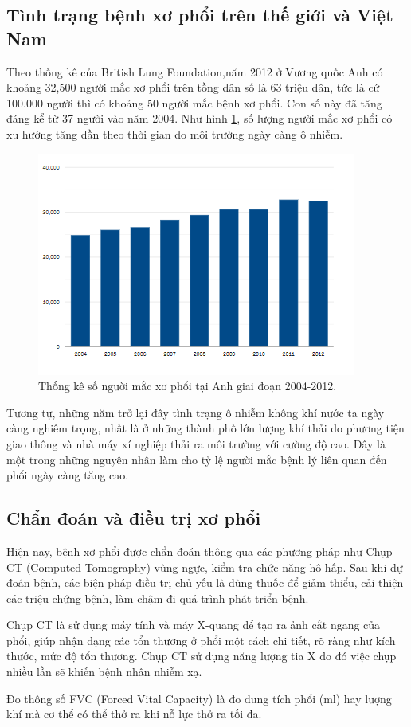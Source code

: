 \subsection{Tình trạng bệnh xơ phổi trên thế giới và Việt Nam}
Theo thống kê của British Lung Foundation,năm 2012 ở Vương quốc Anh có khoảng 32,500 người mắc xơ phổi trên tồng dân số là 63 triệu dân, tức là cứ 100.000 người thì có khoảng 50 người mắc bệnh xơ phổi. Con số này đã tăng đáng kể từ 37 người vào năm 2004. Như hình \ref{fig:pf2}, số lượng người mắc xơ phổi có xu hướng tăng dần theo thời gian do môi trường ngày càng ô nhiễm.\par
\begin{figure}[ht!]
\centerline{\includegraphics[scale=0.7]{images/pf2.png}}
\caption{Thống kê số người mắc xơ phổi tại Anh giai đoạn 2004-2012\cite{PF2:web}.}
\label{fig:pf2}
\end{figure}
Tương tự, những năm trở lại đây tình trạng ô nhiễm không khí nước ta ngày càng nghiêm trọng, nhất là ở những thành phố lớn lượng khí thải do phương tiện giao thông và nhà máy xí nghiệp thải ra môi trường với cường độ cao. Đây là một trong những nguyên nhân làm cho tỷ lệ người mắc bệnh lý liên quan đến phổi ngày càng tăng cao.
\subsection{Chẩn đoán và điều trị xơ phổi}
Hiện nay, bệnh xơ phổi được chẩn đoán thông qua các phương pháp như Chụp CT (Computed Tomography) vùng ngực, kiểm tra chức năng hô hấp. Sau khi dự đoán bệnh, các biện pháp điều trị chủ yếu là dùng thuốc để giảm thiểu, cải thiện các triệu chứng bệnh, làm chậm đi quá trình phát triển bệnh.\par
Chụp CT là sử dụng máy tính và máy X-quang để tạo ra ảnh cắt ngang của phổi, giúp nhận dạng các tổn thương ở phổi một cách chi tiết, rõ ràng như kích thước, mức độ tổn thương. Chụp CT sử dụng năng lượng tia X do đó việc chụp nhiều lần sẽ khiến bệnh nhân nhiễm xạ. \par
Đo thông số FVC (Forced Vital Capacity) là đo dung tích phổi (ml) hay lượng khí mà cơ thể có thể thở ra khi nỗ lực thở ra tối đa.\par

